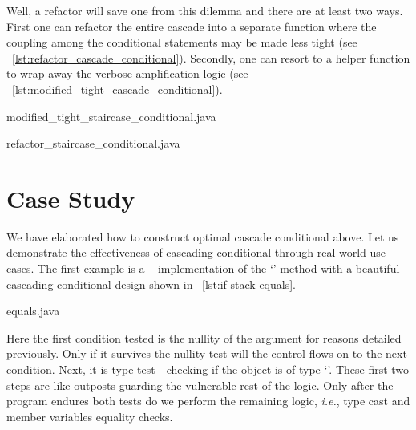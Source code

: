 Well, a refactor will save one from this dilemma and there are at least two ways.
First one can refactor the entire cascade into a separate function where the
coupling among the conditional statements may be made less tight
(see ~\autoref{lst:refactor_cascade_conditional}).
Secondly, one can resort to a helper function to wrap away the verbose amplification logic
(see ~\autoref{lst:modified_tight_cascade_conditional}).


\begin{clisting}
    \begin{minipage}[t]{.4\textwidth}
        
        {modified_tight_staircase_conditional.java}
    \end{minipage}
    \hfill
    \begin{minipage}[t]{.4\textwidth}
        
        {refactor_staircase_conditional.java}
    \end{minipage}
\end{clisting}

\section{Case Study}\label{sec:casestudy-cascif}

We have elaborated how to construct optimal cascade conditional above.
Let us demonstrate the effectiveness of cascading conditional through real-world use cases.
The first example is a \java~ implementation of the `' method with a
beautiful cascading conditional design shown in ~\autoref{lst:if-stack-equals}.
\begin{clisting}
    
    {equals.java}
\end{clisting}
Here the first condition tested is the nullity of the argument for reasons detailed previously.
Only if it survives the nullity test will the control flows on to the next condition.
Next, it is type test---checking if the object is of type `'.
These first two steps are like outposts guarding the vulnerable rest of the logic.
Only after the program endures both tests do we perform the remaining logic, \textit{i.e.}, type
cast and member variables equality checks.

